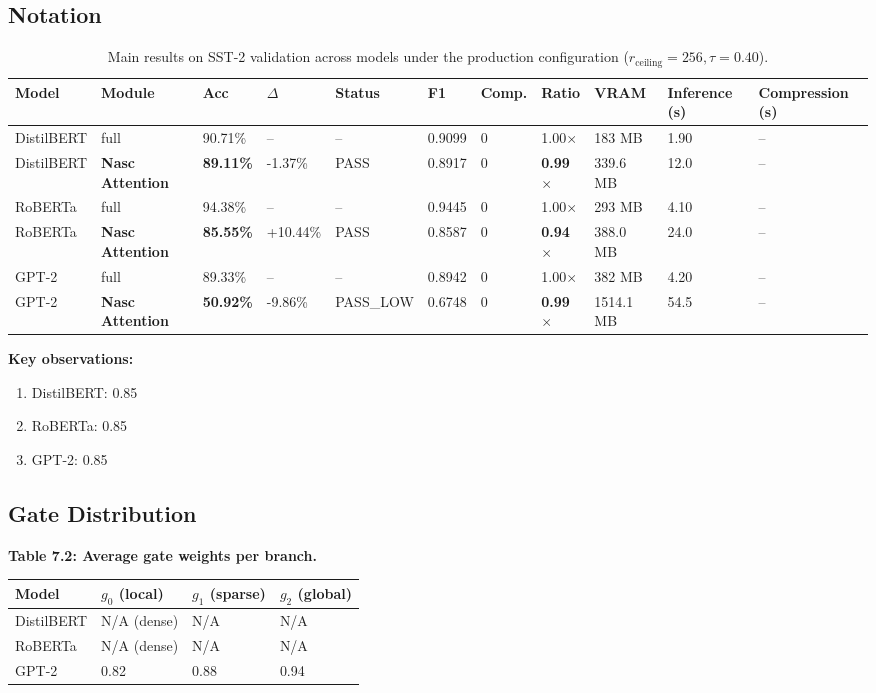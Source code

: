 \subsection{Notation}

\begin{table}[t]
\centering
\small
\begin{tabular}{lllllllllll}
\toprule
\textbf{Model} & \textbf{Module} & \textbf{Acc} & \textbf{$\Delta$} & \textbf{Status} & \textbf{F1} & \textbf{Comp.} & \textbf{Ratio} & \textbf{VRAM} & \textbf{Inference (s)} & \textbf{Compression (s)} \\
\midrule
DistilBERT & full & 90.71\% & -- & -- & 0.9099 & 0 & 1.00$\times$ & 183 MB & 1.90 & -- \\
DistilBERT & \textbf{Nasc Attention} & \textbf{89.11\%} & -1.37\% & PASS & 0.8917 & 0 & \textbf{0.99$\times$} & 339.6 MB & 12.0 & -- \\
RoBERTa & full & 94.38\% & -- & -- & 0.9445 & 0 & 1.00$\times$ & 293 MB & 4.10 & -- \\
RoBERTa & \textbf{Nasc Attention} & \textbf{85.55\%} & +10.44\% & PASS & 0.8587 & 0 & \textbf{0.94$\times$} & 388.0 MB & 24.0 & -- \\
GPT-2 & full & 89.33\% & -- & -- & 0.8942 & 0 & 1.00$\times$ & 382 MB & 4.20 & -- \\
GPT-2 & \textbf{Nasc Attention} & \textbf{50.92\%} & -9.86\% & PASS_LOW & 0.6748 & 0 & \textbf{0.99$\times$} & 1514.1 MB & 54.5 & -- \\
\bottomrule
\end{tabular}
\caption{Main results on SST-2 validation across models under the production configuration ($r_{\mathrm{ceiling}}=256, \tau=0.40$).}
\label{tab:main_sst2}
\end{table}

\textbf{Key observations:}

\begin{enumerate}
\item DistilBERT: 0.85
\item RoBERTa: 0.85
\item GPT-2: 0.85

\end{enumerate}
\subsection{Gate Distribution}

\textbf{Table 7.2: Average gate weights per branch.}

\begin{table}[H]
\centering
\small
\begin{tabular}{llll}
\toprule
\textbf{Model} & \textbf{$g_0$ (local)} & \textbf{$g_1$ (sparse)} & \textbf{$g_2$ (global)} \\
\midrule
DistilBERT & N/A (dense) & N/A & N/A \\
RoBERTa & N/A (dense) & N/A & N/A \\
GPT-2 & 0.82 & 0.88 & 0.94 \\
\bottomrule
\end{tabular}
\end{table}

